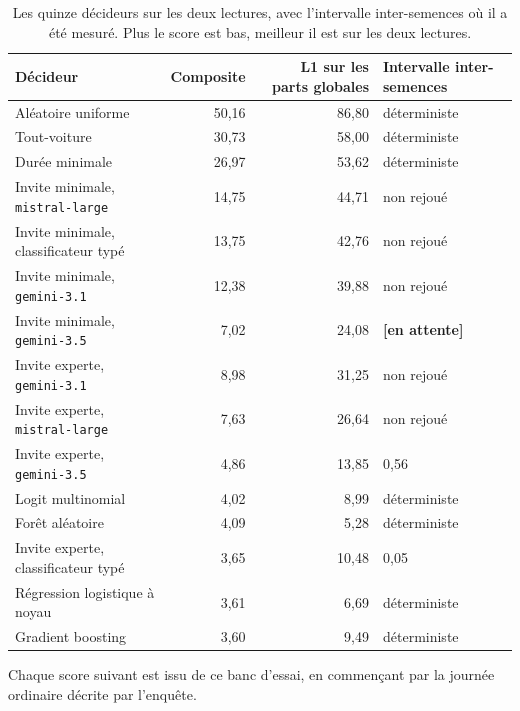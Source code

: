 \begin{table}[tp]
  \caption{Les quinze décideurs sur les deux lectures, avec l'intervalle inter-semences où il a été mesuré. Plus le score est bas, meilleur il est sur les deux lectures.}
  \label{tab:scale}
  \begin{tabular}{lrrl}
    \toprule
    Décideur & Composite & L1 sur les parts globales & Intervalle inter-semences \\
    \midrule
    Aléatoire uniforme                                     & 50,16 & 86,80 & déterministe \\
    Tout-voiture                                           & 30,73 & 58,00 & déterministe \\
    Durée minimale                                         & 26,97 & 53,62 & déterministe \\
    Invite minimale, \texttt{mistral-large}                & 14,75 & 44,71 & non rejoué \\
    Invite minimale, classificateur typé                   & 13,75 & 42,76 & non rejoué \\
    Invite minimale, \texttt{gemini-3.1}                   & 12,38 & 39,88 & non rejoué \\
    Invite minimale, \texttt{gemini-3.5}                   &  7,02 & 24,08 & \textbf{[en attente]} \\
    Invite experte, \texttt{gemini-3.1}                    &  8,98 & 31,25 & non rejoué \\
    Invite experte, \texttt{mistral-large}                 &  7,63 & 26,64 & non rejoué \\
    Invite experte, \texttt{gemini-3.5}                    &  4,86 & 13,85 & 0,56 \\
    Logit multinomial                                      &  4,02 &  8,99 & déterministe \\
    Forêt aléatoire                                        &  4,09 &  5,28 & déterministe \\
    Invite experte, classificateur typé                    &  3,65 & 10,48 & 0,05 \\
    Régression logistique à noyau                          &  3,61 &  6,69 & déterministe \\
    Gradient boosting                                      &  3,60 &  9,49 & déterministe \\
    \bottomrule
  \end{tabular}
\end{table}

Chaque score suivant est issu de ce banc d'essai, en commençant par la journée ordinaire décrite par l'enquête.

